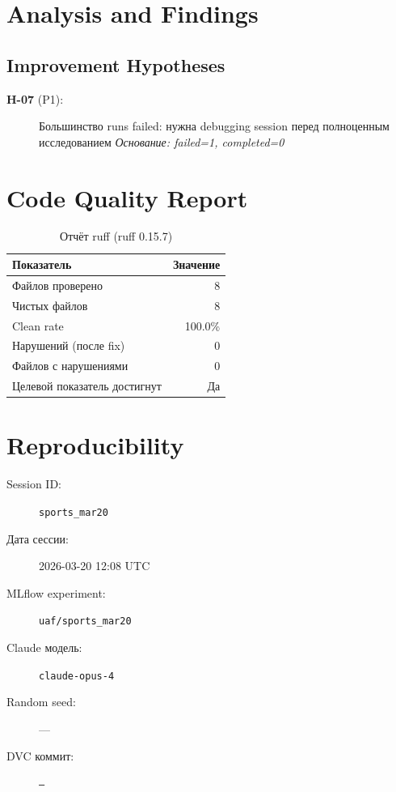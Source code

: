 \documentclass[12pt,a4paper]{article}
\begin{document}
\section{Analysis and Findings}





\subsection{Improvement Hypotheses}

\begin{description}
    \item[\textbf{H-07} (P1):] Большинство runs failed: нужна debugging session перед полноценным исследованием
    \textit{Основание: failed=1, completed=0}
\end{description}




\section{Code Quality Report}

\begin{table}[H]
\centering
\caption{Отчёт ruff (ruff 0.15.7)}
\begin{tabular}{lr}
\toprule
Показатель & Значение \\
\midrule
Файлов проверено & 8 \\
Чистых файлов & 8 \\
Clean rate & \textcolor{passcolor}{100.0\%} \\
Нарушений (после fix) & \textcolor{passcolor}{0} \\
Файлов с нарушениями & 0 \\
Целевой показатель достигнут & \textcolor{passcolor}{Да} \\
\bottomrule
\end{tabular}
\end{table}





\section{Reproducibility}

\begin{description}
    \item[Session ID:] \texttt{sports\_mar20}
    \item[Дата сессии:] 2026-03-20 12:08 UTC
    \item[MLflow experiment:] \texttt{uaf/sports\_mar20}
    \item[Claude модель:] \texttt{claude-opus-4}
    \item[Random seed:] ---
    \item[DVC коммит:] \texttt{---}
\end{description}
\end{document}
